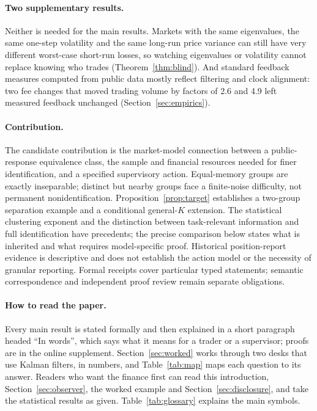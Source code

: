 \documentclass[12pt]{article}
\theoremstyle{definition}
\theoremstyle{remark}
\begin{document}
\paragraph{Two supplementary results.} Neither is needed for the main results. Markets with the same eigenvalues, the same one-step volatility and the same long-run price variance can still have very different worst-case short-run losses, so watching eigenvalues or volatility cannot replace knowing who trades (Theorem~\ref{thm:blind}). And standard feedback measures computed from public data mostly reflect filtering and clock alignment: two fee changes that moved trading volume by factors of 2.6 and 4.9 left measured feedback unchanged (Section~\ref{sec:empirics}).

\paragraph{Contribution.} The candidate contribution is the market-model connection between a public-response equivalence class, the sample and financial resources needed for finer identification, and a specified supervisory action. Equal-memory groups are exactly inseparable; distinct but nearby groups face a finite-noise difficulty, not permanent nonidentification. Proposition~\ref{prop:target} establishes a two-group separation example and a conditional general-$K$ extension. The statistical clustering exponent and the distinction between task-relevant information and full identification have precedents; the precise comparison below states what is inherited and what requires model-specific proof. Historical position-report evidence is descriptive and does not establish the action model or the necessity of granular reporting. Formal receipts cover particular typed statements; semantic correspondence and independent proof review remain separate obligations.

\paragraph{How to read the paper.} Every main result is stated formally and then explained in a short paragraph headed ``In words'', which says what it means for a trader or a supervisor; proofs are in the online supplement. Section~\ref{sec:worked} works through two desks that use Kalman filters, in numbers, and Table~\ref{tab:map} maps each question to its answer. Readers who want the finance first can read this introduction, Section~\ref{sec:observer}, the worked example and Section~\ref{sec:disclosure}, and take the statistical results as given. Table~\ref{tab:glossary} explains the main symbols.
\end{document}
